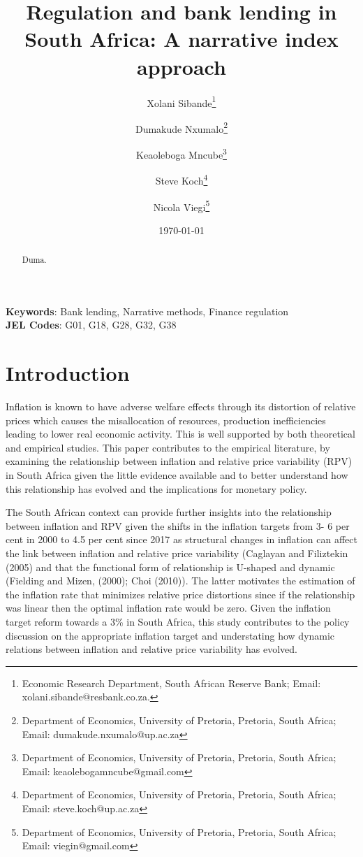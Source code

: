 \documentclass[
  letterpaper,
  DIV=11,
  numbers=noendperiod]{scrartcl}
\author{}
\date{}
\begin{document}
\title{Regulation and bank lending in South Africa: A narrative index approach}





\author {Xolani Sibande\footnote{Economic Research Department, South African Reserve Bank; Email: xolani.sibande@resbank.co.za.} \and
Dumakude Nxumalo\footnote{Department of Economics, University of Pretoria, Pretoria, South Africa; Email: dumakude.nxumalo@up.ac.za} \and
Keaoleboga Mncube\footnote{Department of Economics, University of Pretoria, Pretoria, South Africa; Email: keaolebogamncube@gmail.com} \and
Steve Koch\footnote{Department of Economics, University of Pretoria, Pretoria, South Africa; Email: steve.koch@up.ac.za} \and
Nicola Viegi\footnote{Department of Economics, University of Pretoria, Pretoria, South Africa; Email: viegin@gmail.com}}


\date{\today}
\maketitle

\begin{abstract}
Duma.

\end{abstract}

\noindent\textbf{Keywords}: Bank lending, Narrative methods, Finance regulation\\
\textbf{JEL Codes}: G01, G18, G28, G32, G38
\newpage

\section{Introduction}\label{introduction}

Inflation is known to have adverse welfare effects through its
distortion of relative prices which causes the misallocation of
resources, production inefficiencies leading to lower real economic
activity. This is well supported by both theoretical and empirical
studies. This paper contributes to the empirical literature, by
examining the relationship between inflation and relative price
variability (RPV) in South Africa given the little evidence available
and to better understand how this relationship has evolved and the
implications for monetary policy.

The South African context can provide further insights into the
relationship between inflation and RPV given the shifts in the inflation
targets from 3- 6 per cent in 2000 to 4.5 per cent since 2017 as
structural changes in inflation can affect the link between inflation
and relative price variability (Caglayan and Filiztekin (2005) and that
the functional form of relationship is U-shaped and dynamic (Fielding
and Mizen, (2000); Choi (2010)). The latter motivates the estimation of
the inflation rate that minimizes relative price distortions since if
the relationship was linear then the optimal inflation rate would be
zero. Given the inflation target reform towards a 3\% in South Africa,
this study contributes to the policy discussion on the appropriate
inflation target and understating how dynamic relations between
inflation and relative price variability has evolved.
\end{document}
